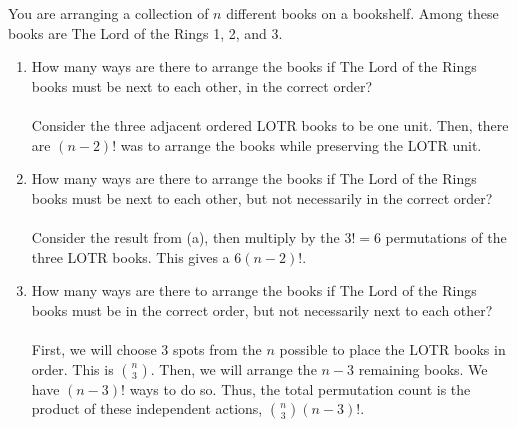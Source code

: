\documentclass[../hw1]{subfiles}
\begin{document}
You are arranging a collection of $n$ different books on a bookshelf. Among these books are The Lord of the Rings 1, 2, and 3.
\begin{enumerate}
	\item How many ways are there to arrange the books if The Lord of the Rings books must be next to each other, in the correct order?
	      \\\\
	      Consider the three adjacent ordered LOTR books to be one unit. Then, there are $(n-2)!$ was to arrange the books while preserving the LOTR unit.
	      \\
	\item How many ways are there to arrange the books if The Lord of the Rings books must be next to each other, but not necessarily in the correct order?
	      \\\\
	      Consider the result from (a), then multiply by the $3! = 6$ permutations of the three LOTR books. This gives a $6(n-2)!$.
	      \\
	\item How many ways are there to arrange the books if The Lord of the Rings books must be in the correct order, but not necessarily next to each other?
	      \\\\
	      First, we will choose 3 spots from the $n$ possible to place the LOTR books in order. This is $\binom{n}{3}$.
	      Then, we will arrange the $n-3$ remaining books. We have  $(n-3)!$ ways to do so.
	      Thus, the total permutation count is the product of these independent actions, $\binom{n}{3}(n-3)!$.
\end{enumerate}
\end{document}
